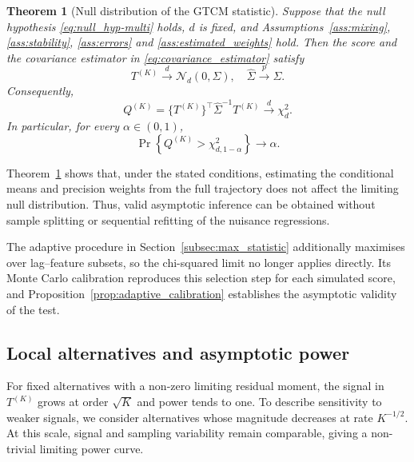 \documentclass[12pt]{article}
\newtheorem{theorem}{Theorem}[section]
\numberwithin{equation}{section}
\begin{document}
\begin{theorem}[Null distribution of the GTCM statistic]
\label{thm:vector_gtcm}
Suppose that the null hypothesis \eqref{eq:null_hyp-multi} holds, \(d\) is
fixed, and Assumptions~\ref{ass:mixing}, \ref{ass:stability},
\ref{ass:errors} and \ref{ass:estimated_weights} hold. Then the score and the
covariance estimator in \eqref{eq:covariance_estimator} satisfy
\begin{equation}
    \label{eq:martingaleCLT}
    T^{(K)}
    \xrightarrow{d}
    \mathcal N_d(0,\Sigma),\quad
    \hat\Sigma\xrightarrow{p}\Sigma.
\end{equation}
Consequently,
\begin{equation}
    Q^{(K)}
    =
    \{T^{(K)}\}^{\top}
    \hat\Sigma^{-1}
    T^{(K)}
    \xrightarrow{d}
    \chi_d^2.
    \label{eq:martingaleCLT2}
\end{equation}
In particular, for every \(\alpha\in(0,1)\),
\begin{equation}
    \Pr\left\{
        Q^{(K)}>\chi^2_{d,1-\alpha}
    \right\}
    \rightarrow
    \alpha.
    \label{eq:gtcm_size}
\end{equation}
\end{theorem}

Theorem~\ref{thm:vector_gtcm} shows that, under the stated conditions, estimating the conditional means and precision weights from the full trajectory does not affect the limiting null distribution. Thus, valid asymptotic inference can be obtained without sample splitting or sequential refitting of the nuisance regressions.

The adaptive procedure in Section~\ref{subsec:max_statistic} additionally maximises over lag--feature subsets, so the chi-squared limit no longer applies directly. Its Monte Carlo calibration reproduces this selection step for each simulated score, and Proposition~\ref{prop:adaptive_calibration} establishes the asymptotic validity of the test.



\subsection{Local alternatives and asymptotic power}
\label{subsec:local_power}

For fixed alternatives with a non-zero limiting residual
moment, the signal in \(T^{(K)}\) grows at order \(\sqrt K\) and power
tends to one. To describe sensitivity to weaker signals, we consider
alternatives whose magnitude decreases at rate \(K^{-1/2}\). At this
scale, signal and sampling variability remain comparable, giving a
non-trivial limiting power curve.
\end{document}
